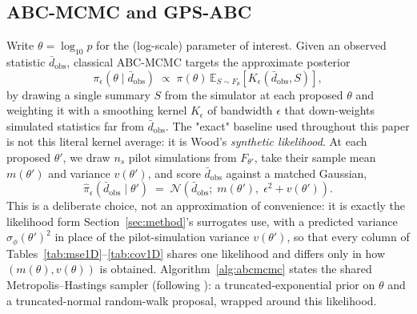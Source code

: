 \documentclass[sn-basic,iicol,pdflatex]{sn-jnl}
\newcommand{\dbar}{\ensuremath{\bar d}}
\begin{document}
\subsection{ABC-MCMC and GPS-ABC}
\label{sec:abcmcmc}

Write $\theta = \log_{10} p$ for the (log-scale) parameter of interest. Given
an observed statistic $\dbar_{\mathrm{obs}}$, classical ABC-MCMC
\citep{marjoram2003} targets the approximate posterior
\[
\pi_\epsilon(\theta \mid \dbar_{\mathrm{obs}}) \;\propto\; \pi(\theta)\,
\mathbb{E}_{S \sim F_\theta}\!\left[K_\epsilon\!\left(\dbar_{\mathrm{obs}}, S\right)\right],
\]
by drawing a single summary $S$ from the simulator at each proposed $\theta$
and weighting it with a smoothing kernel $K_\epsilon$ of bandwidth $\epsilon$
that down-weights simulated statistics far from $\dbar_{\mathrm{obs}}$. The
"exact" baseline used throughout this paper is not this literal kernel
average: it is Wood's \citep{wood2010} \emph{synthetic likelihood}. At each
proposed $\theta'$, we draw $n_s$ pilot simulations from $F_{\theta'}$, take
their sample mean $m(\theta')$ and variance $v(\theta')$, and score
$\dbar_{\mathrm{obs}}$ against a matched Gaussian,
\[
\hat\pi_\epsilon(\dbar_{\mathrm{obs}} \mid \theta') \;=\;
\mathcal{N}\!\left(\dbar_{\mathrm{obs}};\; m(\theta'),\; \epsilon^2 + v(\theta')\right).
\]
This is a deliberate choice, not an approximation of convenience: it is
exactly the likelihood form Section~\ref{sec:method}'s surrogates use, with a
predicted variance $\sigma_\phi(\theta')^2$ in place of the pilot-simulation
variance $v(\theta')$, so that every column of
Tables~\ref{tab:mse1D}--\ref{tab:cov1D} shares one likelihood and differs only
in how $(m(\theta), v(\theta))$ is obtained. Algorithm~\ref{alg:abcmcmc}
states the shared Metropolis--Hastings sampler (following
\citeauthor{lu2023}): a truncated-exponential prior on $\theta$ and a
truncated-normal random-walk proposal, wrapped around this likelihood.
\end{document}
